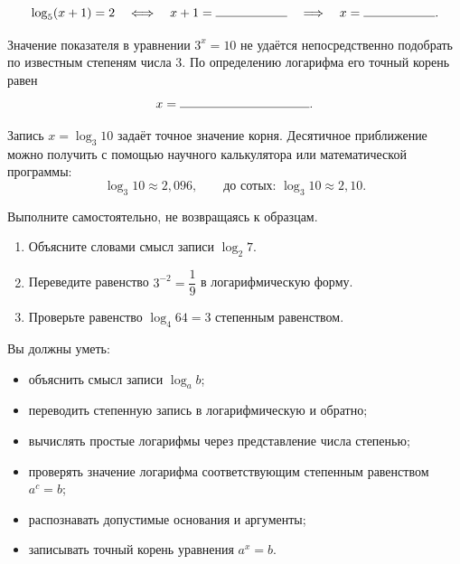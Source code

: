 \begin{fillbox}
  \[
    \log_5(x+1)=2
    \quad\Longleftrightarrow\quad
    x+1=\answerblank[20mm]
    \quad\Longrightarrow\quad
    x=\answerblank[20mm].
  \]
\end{fillbox}

\begin{fillbox}
  Значение показателя в уравнении \(3^x=10\) не удаётся непосредственно
  подобрать по известным степеням числа 3. По определению логарифма его
  точный корень равен
  \[
    x=\answerblank[36mm].
  \]
\end{fillbox}

\begin{notebox}
  Запись \(x=\log_3 10\) задаёт точное значение корня. Десятичное
  приближение можно получить с помощью научного калькулятора или
  математической программы:
  \[
    \log_3 10\approx2{,}096,
    \qquad
    \text{до сотых: }\log_3 10\approx2{,}10.
  \]
\end{notebox}

\begin{questionsbox}
  Выполните самостоятельно, не возвращаясь к образцам.
  \begin{enumerate}[itemsep=0.45em]
    \item Объясните словами смысл записи \(\log_2 7\).
    \item Переведите равенство \(3^{-2}=\dfrac19\) в логарифмическую форму.
    \item Проверьте равенство \(\log_4 64=3\) степенным равенством.
  \end{enumerate}
\end{questionsbox}

\begin{checkpointbox}
  Вы должны уметь:
  \begin{itemize}
    \item объяснить смысл записи \(\log_a b\);
    \item переводить степенную запись в логарифмическую и обратно;
    \item вычислять простые логарифмы через представление числа степенью;
    \item проверять значение логарифма соответствующим степенным
      равенством \(a^c=b\);
    \item распознавать допустимые основания и аргументы;
    \item записывать точный корень уравнения \(a^x=b\).
  \end{itemize}
\end{checkpointbox}

